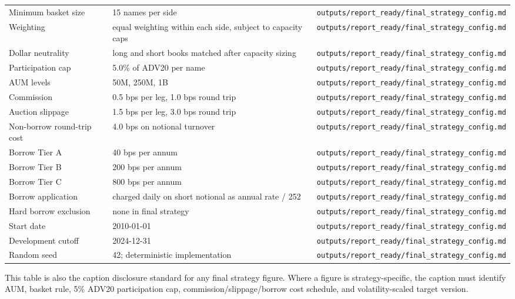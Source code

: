 \documentclass[
]{article}
\begin{document}
\begin{longtable}[]{@{}lll@{}}
Minimum basket size & 15 names per side &
\texttt{outputs/report\_ready/final\_strategy\_config.md} \\
Weighting & equal weighting within each side, subject to capacity caps &
\texttt{outputs/report\_ready/final\_strategy\_config.md} \\
Dollar neutrality & long and short books matched after capacity sizing &
\texttt{outputs/report\_ready/final\_strategy\_config.md} \\
Participation cap & 5.0\% of ADV20 per name &
\texttt{outputs/report\_ready/final\_strategy\_config.md} \\
AUM levels & 50M, 250M, 1B &
\texttt{outputs/report\_ready/final\_strategy\_config.md} \\
Commission & 0.5 bps per leg, 1.0 bps round trip &
\texttt{outputs/report\_ready/final\_strategy\_config.md} \\
Auction slippage & 1.5 bps per leg, 3.0 bps round trip &
\texttt{outputs/report\_ready/final\_strategy\_config.md} \\
Non-borrow round-trip cost & 4.0 bps on notional turnover &
\texttt{outputs/report\_ready/final\_strategy\_config.md} \\
Borrow Tier A & 40 bps per annum &
\texttt{outputs/report\_ready/final\_strategy\_config.md} \\
Borrow Tier B & 200 bps per annum &
\texttt{outputs/report\_ready/final\_strategy\_config.md} \\
Borrow Tier C & 800 bps per annum &
\texttt{outputs/report\_ready/final\_strategy\_config.md} \\
Borrow application & charged daily on short notional as annual rate /
252 & \texttt{outputs/report\_ready/final\_strategy\_config.md} \\
Hard borrow exclusion & none in final strategy &
\texttt{outputs/report\_ready/final\_strategy\_config.md} \\
Start date & 2010-01-01 &
\texttt{outputs/report\_ready/final\_strategy\_config.md} \\
Development cutoff & 2024-12-31 &
\texttt{outputs/report\_ready/final\_strategy\_config.md} \\
Random seed & 42; deterministic implementation &
\texttt{outputs/report\_ready/final\_strategy\_config.md} \\
\bottomrule
\end{longtable}

This table is also the caption disclosure standard for any final
strategy figure. Where a figure is strategy-specific, the caption must
identify AUM, basket rule, 5\% ADV20 participation cap,
commission/slippage/borrow cost schedule, and volatility-scaled target
version.
\end{document}
